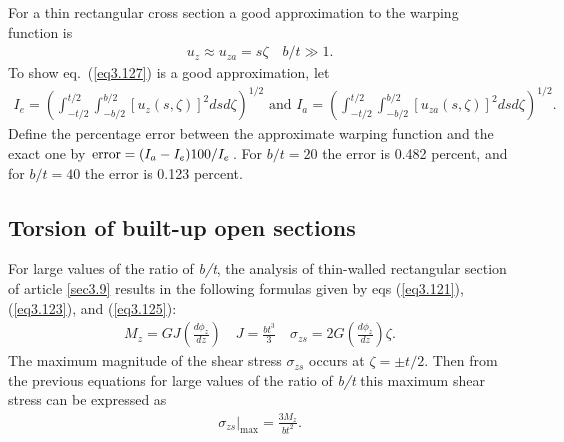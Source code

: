 \documentclass{AeroStructure-ERJohnson}
\begin{document}
{\def\thefigure{3.18}
}

For a thin rectangular cross section a good approximation to the warping function is
\begin{align}\label{eq3.127}
u_{z} \approx u_{z a}=s \zeta \quad b / t \gg 1.
\end{align}
To show eq.~(\ref{eq3.127}) is a good approximation, let
\begin{align*}
I_{e}=\left(\int_{-t / 2}^{t/2}\int_{-b / 2}^{b/2}\left[u_{z}(s, \zeta)\right]^{2} d s d \zeta\right)^{1 / 2}\mbox{ and }
I_{a}=\left(\int_{-t / 2}^{t/2}\int_{-b / 2}^{b/2}\left[u_{z a}(s, \zeta)\right]^{2} d s d \zeta\right)^{1 / 2}.
\end{align*}
Define the percentage error between the approximate warping function and the exact one by $\textrm{error} = (I_{a}-I_{e}) 100 / I_{e}$. For $b / t=20$ the error is 0.482 percent, and for $b / t=40$ the error is 0.123 percent.

\subsection{Torsion of built-up open sections}\label{sec3.9.1}

For large values of the ratio of \textit{b/t}, the analysis of thin-walled rectangular section of article \ref{sec3.9} results in the following formulas given by eqs (\ref{eq3.121}), (\ref{eq3.123}), and (\ref{eq3.125}):
\begin{align}\label{eq3.128}
M_{z}=G J\left(\frac{d \phi_{z}}{d z}\right) \quad J=\frac{b t^{3}}{3} \quad \sigma_{z s}=2 G\left(\frac{d \phi_{z}}{d z}\right) \zeta.
\end{align}
The maximum magnitude of the shear stress $\sigma_{z s}$ occurs at $\zeta=\pm t / 2$. Then from the previous equations for large values of the ratio of \textit{b/t} this maximum shear stress can be expressed as
\begin{align}\label{eq3.129}
\left.\sigma_{z s}\right|_{\max }=\frac{3 M_{z}}{b t^{2}}.
\end{align}
\end{document}
